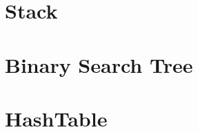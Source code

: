 \documentclass[../main.tex]{subfiles}
\begin{document}
	\section{Stack}
	
	
	
	
	\section{Binary Search Tree}
	
	\section{HashTable}
	
\end{document}
